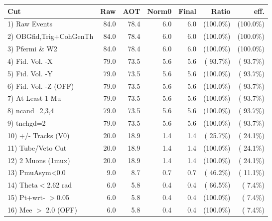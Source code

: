  \begin{table}[h!]\centering
 \begin{tabular}{||l||r|r|r|r|r|r||}
 \hline
 \hline
 Cut & Raw & AOT & Norm0 & Final & Ratio & eff.       \\
 \hline
  1) Raw Events           &         84.0 &         78.4 &          6.0 &          6.0 & (100.0\%) & (100.0\%) \\
  2) OBGfid,Trig+CohGenTh &         84.0 &         78.4 &          6.0 &          6.0 & (100.0\%) & (100.0\%) \\
  3) Pfermi \& W2         &         84.0 &         78.4 &          6.0 &          6.0 & (100.0\%) & (100.0\%) \\
  4) Fid. Vol. -X         &         79.0 &         73.5 &          5.6 &          5.6 & ( 93.7\%) & ( 93.7\%) \\
  5) Fid. Vol. -Y         &         79.0 &         73.5 &          5.6 &          5.6 & (100.0\%) & ( 93.7\%) \\
  6) Fid. Vol. -Z (OFF)   &         79.0 &         73.5 &          5.6 &          5.6 & (100.0\%) & ( 93.7\%) \\
  7) At Least 1 Mu        &         79.0 &         73.5 &          5.6 &          5.6 & (100.0\%) & ( 93.7\%) \\
  8) ncand=2,3,4          &         79.0 &         73.5 &          5.6 &          5.6 & (100.0\%) & ( 93.7\%) \\
  9) tnchgd=2             &         79.0 &         73.5 &          5.6 &          5.6 & (100.0\%) & ( 93.7\%) \\
 10) +/- Tracks (V0)      &         20.0 &         18.9 &          1.4 &          1.4 & ( 25.7\%) & ( 24.1\%) \\
 11) Tube/Veto Cut        &         20.0 &         18.9 &          1.4 &          1.4 & (100.0\%) & ( 24.1\%) \\
 12) 2 Muons (1mux)       &         20.0 &         18.9 &          1.4 &          1.4 & (100.0\%) & ( 24.1\%) \\
 13) PmuAsym<0.0          &          9.0 &          8.7 &          0.7 &          0.7 & ( 46.2\%) & ( 11.1\%) \\
 14) Theta$<$2.62 rad     &          6.0 &          5.8 &          0.4 &          0.4 & ( 66.5\%) & (  7.4\%) \\
 15) Pt+wrt- $>$0.05      &          6.0 &          5.8 &          0.4 &          0.4 & (100.0\%) & (  7.4\%) \\
 16) Mee $>$ 2.0  (OFF)   &          6.0 &          5.8 &          0.4 &          0.4 & (100.0\%) & (  7.4\%) \\

\end{tabular}
\end{table}
